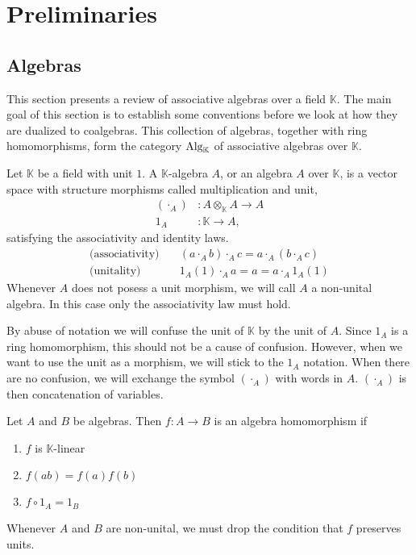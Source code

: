 \documentclass[../thesis.tex]{subfiles}
\begin{document}
    \section{Preliminaries}    
    \subsection{Algebras}

            This section presents a review of associative algebras over a field $\mathbb{K}$. The main goal of this section is to establish some conventions before we look at how they are dualized to coalgebras. This collection of algebras, together with ring homomorphisms, form the category $\tt{Alg}_{\mathbb{K}}$ of associative algebras over $\mathbb{K}$.

            \begin{definition}
                Let $\mathbb{K}$ be a field with unit $1$. A $\mathbb{K}$-algebra $A$, or an algebra $A$ over $\mathbb{K}$, is a vector space with structure morphisms called multiplication and unit,
                \begin{align*}
                    (\cdot_A) & : A\otimes_{\mathbb{K}}A \rightarrow A \\
                    1_A & : \mathbb{K} \rightarrow A,
                \end{align*}
                satisfying the associativity and identity laws. 
                \begin{align*}
                    \text{(associativity)}\quad & (a \cdot_A b) \cdot_A c = a \cdot_A (b \cdot_A c) \\
                    \text{(unitality)}\quad & 1_A(1) \cdot_A a = a = a \cdot_A 1_A(1)
                \end{align*}
                Whenever $A$ does not posess a unit morphism, we will call $A$ a non-unital algebra. In this case only the associativity law must hold.
            \end{definition}

            By abuse of notation we will confuse the unit of $\mathbb{K}$ by the unit of $A$. Since $1_A$ is a ring homomorphism, this should not be a cause of confusion. However, when we want to use the unit as a morphism, we will stick to the $1_A$ notation. When there are no confusion, we will exchange the symbol $(\cdot_A)$ with words in $A$. $(\cdot_A)$ is then concatenation of variables. 

            \begin{definition}
                Let $A$ and $B$ be algebras. Then $f: A\rightarrow B$ is an algebra homomorphism if
                \begin{enumerate}
                    \item $f$ is $\mathbb{K}$-linear
                    \item $f(ab)=f(a)f(b)$
                    \item $f\circ 1_A = 1_B$
                \end{enumerate}
                Whenever $A$ and $B$ are non-unital, we must drop the condition that $f$ preserves units.
            \end{definition}
\end{document}

